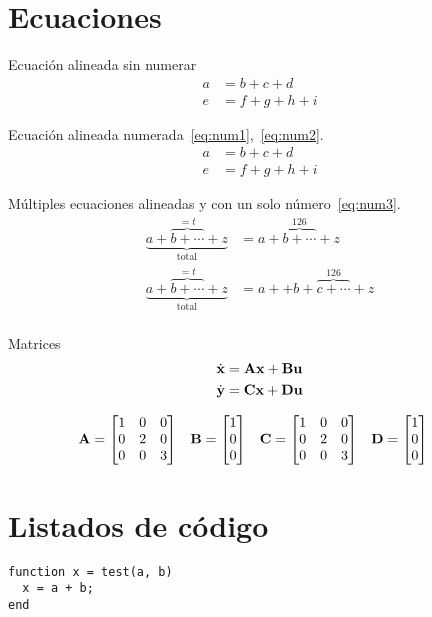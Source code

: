 \section{Ecuaciones}
Ecuación alineada sin numerar
\begin{align*}
a &= b + c + d \\
e &= f + g + h + i
\end{align*}

Ecuación alineada numerada~\eqref{eq:num1},~\eqref{eq:num2}.
\begin{align}
a &= b + c + d \label{eq:num1} \\
e &= f + g + h + i \label{eq:num2}
\end{align}

Múltiples ecuaciones alineadas y con un solo número~\eqref{eq:num3}.
\begin{equation}
\begin{split}
\underbrace{a+\overbrace{b+\cdots}^{=t}+z}
_{\mathrm{total}} &= 
a+{\overbrace{b+\cdots}}^{126}+z \\
\underbrace{a+\overbrace{b+\cdots}^{=t}+z}
_{\mathrm{total}} &= 
a++b+{\overbrace{c+\cdots}}^{126}+z \\
\end{split}
\label{eq:num3}
\end{equation}

Matrices
\begin{align*}
\dot{\mathbf{x}} &= \mathbf{A}\mathbf{x} + \mathbf{B}\mathbf{u} \\
\dot{\mathbf{y}} &= \mathbf{C}\mathbf{x} + \mathbf{D}\mathbf{u}
\end{align*}

\begin{align*}
\vect{A} &= \begin{bmatrix}
1 & 0 & 0 \\
0 & 2 & 0 \\
0 & 0 & 3
\end{bmatrix}
%
&
%
\vect{B} &= \begin{bmatrix}
1  \\
0  \\
0 
\end{bmatrix}
%
&
%
\vect{C} &= \begin{bmatrix}
1 & 0 & 0 \\
0 & 2 & 0 \\
0 & 0 & 3
\end{bmatrix}
%
&
%
\vect{D} &= \begin{bmatrix}
1  \\
0  \\
0 
\end{bmatrix}
\end{align*}

\section{Listados de código}

\begin{lstlisting}[style=mlab, caption={código MATLAB.}]
function x = test(a, b)
  x = a + b;
end
\end{lstlisting}



